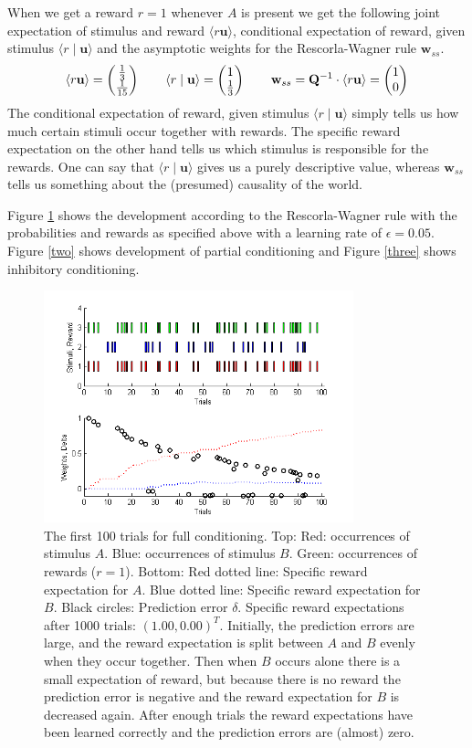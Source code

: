 \documentclass{scrartcl}
\newcommand*\colvec[3][]{
    \begin{pmatrix}\ifx\relax#1\relax\else#1\\\fi#2\\#3\end{pmatrix}
}
\begin{document}
When we get a reward $r = 1$ whenever $A$ is present we get the following joint expectation of stimulus and reward $\langle r \mathbf{u}\rangle$, conditional expectation of reward, given stimulus $\langle r \mid \mathbf{u}\rangle$ and the asymptotic weights for the Rescorla-Wagner rule $\mathbf{w}_{ss}$.
\begin{align*}
\langle r \mathbf{u}\rangle = \colvec{\frac{1}{3}}{\frac{1}{15}} \qquad
\langle r \mid \mathbf{u}\rangle = \colvec{1}{\frac{1}{3}} \qquad
\mathbf{w}_{ss} = \mathbf{Q}^{-1} \cdot \langle r \mathbf{u}\rangle = \colvec{1}{0}
\end{align*}
The conditional expectation of reward, given stimulus $\langle r \mid \mathbf{u}\rangle$ simply tells us how much certain stimuli occur together with rewards. The specific reward expectation on the other hand tells us which stimulus is responsible for the rewards. One can say that $\langle r \mid \mathbf{u}\rangle$ gives us a purely descriptive value, whereas $\mathbf{w}_{ss}$ tells us something about the (presumed) causality of the world.

Figure \ref{one} shows the development according to the Rescorla-Wagner rule with the probabilities and rewards as specified above with a learning rate of $\epsilon = 0.05$. Figure \ref{two} shows development of partial conditioning and Figure \ref{three} shows inhibitory conditioning.

\begin{figure}
\centering
\includegraphics[trim = {0.8cm 0 0.5cm 0.2cm}, width=0.8\textwidth, clip]{../pics/one}
\caption{The first 100 trials for full conditioning. Top: Red: occurrences of stimulus $A$. Blue: occurrences of stimulus $B$. Green: occurrences of rewards ($r = 1$). Bottom: Red dotted line: Specific reward expectation for $A$. Blue dotted line: Specific reward expectation for $B$. Black circles: Prediction error $\delta$. Specific reward expectations after 1000 trials: $(1.00, 0.00)^T$.
Initially, the prediction errors are large, and the reward expectation is split between $A$ and $B$ evenly when they occur together. Then when $B$ occurs alone there is a small expectation of reward, but because there is no reward the prediction error is negative and the reward expectation for $B$ is decreased again. After enough trials the reward expectations have been learned correctly and the prediction errors are (almost) zero.}
\label{one}
\end{figure}
\end{document}
